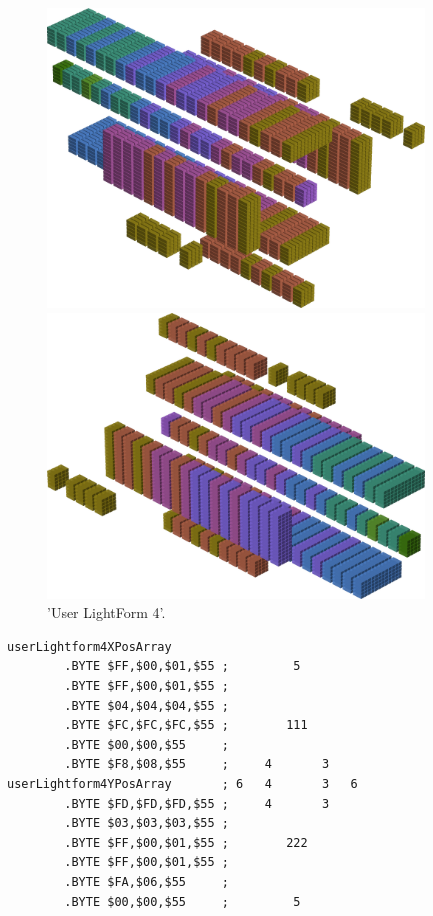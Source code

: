 \begin{figure}[H]
    \centering
    \begin{adjustbox}{width=10cm,center}
      \includegraphics[width=10cm]{src/colorspace_patterns/pattern12-45.png}%
    \end{adjustbox}
    \begin{adjustbox}{width=10cm}
      \includegraphics[width=10cm]{src/colorspace_patterns/pattern12-225.png}%
    \end{adjustbox}
\caption{'User LightForm 4'.}
\end{figure}
\clearpage

\begin{lstlisting}[basicstyle=\tiny]
userLightform4XPosArray
        .BYTE $FF,$00,$01,$55 ;         5        
        .BYTE $FF,$00,$01,$55 ;                  
        .BYTE $04,$04,$04,$55 ;                  
        .BYTE $FC,$FC,$FC,$55 ;        111       
        .BYTE $00,$00,$55     ;                  
        .BYTE $F8,$08,$55     ;     4       3    
userLightform4YPosArray       ; 6   4       3   6
        .BYTE $FD,$FD,$FD,$55 ;     4       3    
        .BYTE $03,$03,$03,$55 ;                  
        .BYTE $FF,$00,$01,$55 ;        222       
        .BYTE $FF,$00,$01,$55 ;                  
        .BYTE $FA,$06,$55     ;                  
        .BYTE $00,$00,$55     ;         5        
\end{lstlisting}


